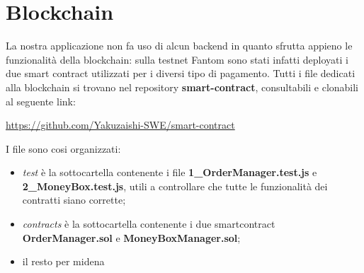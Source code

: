 \section{Blockchain}

La nostra applicazione non fa uso di alcun backend in quanto sfrutta appieno le funzionalità della blockchain: 
sulla testnet Fantom sono stati infatti deployati i due smart contract utilizzati per i diversi tipo di pagamento.
Tutti i file dedicati alla blockchain si trovano nel repository \textbf{smart-contract}, consultabili e clonabili al seguente link:

\begin{center}
    \href{https://github.com/Yakuzaishi-SWE/smart-contract}{https://github.com/Yakuzaishi-SWE/smart-contract}
\end{center}

I file sono cosi organizzati:
\begin{itemize}
    \item \textit{test} è la sottocartella contenente i file \textbf{1\_OrderManager.test.js} e \textbf{2\_MoneyBox.test.js}, utili a controllare che tutte le funzionalità dei contratti siano corrette;
    \item \textit{contracts} è la sottocartella contenente i due smartcontract \textbf{OrderManager.sol} e \textbf{MoneyBoxManager.sol};
    \item il resto per midena
\end{itemize}